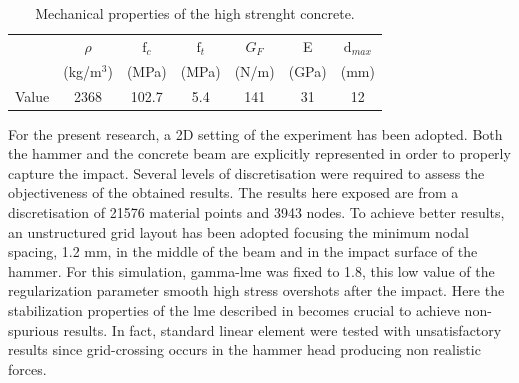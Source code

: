 \documentclass[preprint,12pt,a4paper]{elsarticle}
\begin{document}
\begin{table}
  \centering
  \begin{tabular}[]{c c c c c c c}
    \hline
      &   $\rho$   & $\text{f}_c$ & $\text{f}_t$ & $G_F$ &   E   & $\text{d}_{max}$ \\
      & (kg/m$^3$) &     (MPa)    &     (MPa)    & (N/m) & (GPa) & (mm) \\
    \hline
Value &    2368    &     102.7    &      5.4     &  141  &   31  &  12 \\
    \hline
  \end{tabular}
  \caption[Mechanical properties of thje concrete]{Mechanical
    properties of the high strenght concrete.}
  \label{tab:concrete-properties}
\end{table}
For the present research, a 2D setting of the experiment has been
adopted. Both the hammer and the concrete beam are explicitly
represented in order to properly capture the impact. Several levels of
discretisation were required to assess the objectiveness of the
obtained results. The results here exposed are from a discretisation
of 21576 material points and 3943 nodes. To achieve better results, an
unstructured grid layout has been adopted focusing the minimum nodal
spacing, 1.2 mm, in the middle of the beam and in the impact surface
of the hammer. For this simulation, \gls{gamma-lme} was fixed to
1.8, this low value of the regularization parameter smooth high stress
overshots after the impact. Here the stabilization properties of the \acrshort{lme}
described in \cite{Molinos2020} becomes crucial to achieve
non-spurious results. In fact, standard linear element were tested
with unsatisfactory results since grid-crossing occurs in the hammer
head producing non realistic forces.\\
\end{document}
